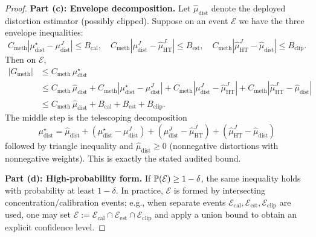 \begin{proof}
\textbf{Part (c): Envelope decomposition.}
Let $\hat{\mu}_{\mathrm{dist}}$ denote the deployed distortion estimator (possibly clipped). Suppose on an event $\mathcal{E}$ we have the three envelope inequalities:
\[
C_{\mathrm{meth}}\!\left|\mu_{\mathrm{dist}}^{\star}-\mu_{\mathrm{dist}}^{J}\right|\le B_{\mathrm{cal}},\quad
C_{\mathrm{meth}}\!\left|\mu_{\mathrm{dist}}^{J}-\hat{\mu}_{\mathrm{HT}}^{J}\right|\le B_{\mathrm{est}},\quad
C_{\mathrm{meth}}\!\left|\hat{\mu}_{\mathrm{HT}}^{J}-\hat{\mu}_{\mathrm{dist}}\right|\le B_{\mathrm{clip}}.
\]
Then on $\mathcal{E}$,
\begin{align*}
|G_{\mathrm{meth}}|
&\le C_{\mathrm{meth}}\,\mu_{\mathrm{dist}}^{\star} \\
&\le C_{\mathrm{meth}}\,\hat{\mu}_{\mathrm{dist}}
 + C_{\mathrm{meth}}\!\left|\mu_{\mathrm{dist}}^{\star}-\mu_{\mathrm{dist}}^{J}\right|
 + C_{\mathrm{meth}}\!\left|\mu_{\mathrm{dist}}^{J}-\hat{\mu}_{\mathrm{HT}}^{J}\right|
 + C_{\mathrm{meth}}\!\left|\hat{\mu}_{\mathrm{HT}}^{J}-\hat{\mu}_{\mathrm{dist}}\right| \\
&\le C_{\mathrm{meth}}\,\hat{\mu}_{\mathrm{dist}} + B_{\mathrm{cal}} + B_{\mathrm{est}} + B_{\mathrm{clip}}.
\end{align*}
The middle step is the telescoping decomposition
\[
\mu_{\mathrm{dist}}^{\star}
=\hat{\mu}_{\mathrm{dist}}
+(\mu_{\mathrm{dist}}^{\star}-\mu_{\mathrm{dist}}^{J})
+(\mu_{\mathrm{dist}}^{J}-\hat{\mu}_{\mathrm{HT}}^{J})
+(\hat{\mu}_{\mathrm{HT}}^{J}-\hat{\mu}_{\mathrm{dist}})
\]
followed by triangle inequality and $\hat{\mu}_{\mathrm{dist}}\ge 0$ (nonnegative distortions with nonnegative weights). This is exactly the stated audited bound.

\textbf{Part (d): High-probability form.}
If $\mathbb{P}(\mathcal{E}) \ge 1-\delta$, the same inequality holds with probability at least $1-\delta$. In practice, $\mathcal{E}$ is formed by intersecting concentration/calibration events; e.g., when separate events $\mathcal{E}_{\mathrm{cal}},\mathcal{E}_{\mathrm{est}},\mathcal{E}_{\mathrm{clip}}$ are used, one may set $\mathcal{E}:=\mathcal{E}_{\mathrm{cal}}\cap\mathcal{E}_{\mathrm{est}}\cap\mathcal{E}_{\mathrm{clip}}$ and apply a union bound to obtain an explicit confidence level.
\end{proof}

